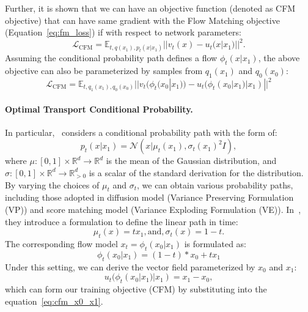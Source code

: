 Further, it is shown that we can have an objective function (denoted as CFM objective) that can have same gradient with the Flow Matching objective (Equation~\ref{eq:fm_loss}) if with respect to network parameters:
\begin{equation}
\label{eq:cfm_loss}
     \mathcal{L}_{\text{CFM}} = \mathbb{E}_{t,q(x_1), p_t(x|x_1)}||v_t(x) - u_t(x|x_1)||^2.
\end{equation}
Assuming the conditional probability path defines a flow $\phi_t(x|x_1)$, the above objective can also be parameterized by samples from $q_1(x_1)$ and $q_0(x_0)$:
\begin{equation}
\label{eq:cfm_x0_x1}
    \mathcal{L}_{\text{CFM}} = \mathbb{E}_{t,q_1(x_1),q_0(x_0)}||v_t(\phi_t(x_0|x_1)) - u_t(\phi_t(x_0|x_1)|x_1)||^2
\end{equation}
%

\paragraph{Optimal Transport Conditional Probability.}
In particular,~\cite{lipman2022flow} considers a conditional probability path with the form of:
\begin{equation}
\label{eq:gaussian_cond}
    p_t(x|x_1) = \mathcal{N}(x|\mu_t(x_1), \sigma_t(x_1)^2 I),
\end{equation}
where $\mu : [0, 1] \times \mathbb{R}^d \rightarrow \mathbb{R}^d$ is the mean of the Gaussian distribution, and $\sigma : [0, 1] \times \mathbb{R}^d \rightarrow \mathbb{R}^d_{> 0}$ is a scalar of the standard derivation for the distribution.
%
By varying the choices of $\mu_t$ and $\sigma_t$, we can obtain various probability paths, including those adopted in diffusion model (Variance Preserving Formulation (VP)) and score matching model (Variance Exploding Formulation (VE)).
%
In~\cite{lipman2022flow}, they introduce a formulation to define the linear path in time:
\begin{equation}
\label{eq:vector_field}
    \mu_t(x) = t x_1, \text{and}, \sigma_t(x) = 1 - t.
\end{equation}
The corresponding flow model $x_t = \phi_t(x_0|x_1)$ is formulated as:
\begin{equation}
\label{eq:linear_flow}
    \phi_t(x_0|x_1) = (1 -t) * x_0 + t x_1
\end{equation}
Under this setting, we can derive the vector field parameterized by $x_0$ and $x_1$:
\begin{equation}
    u_t(\phi_t(x_0|x_1)|x_1) = x_1 - x_0,
\end{equation}
which can form our training objective (CFM) by substituting into the equation~\ref{eq:cfm_x0_x1}.

\fi